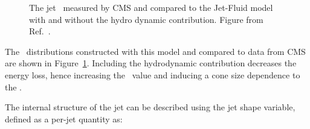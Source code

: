 \begin{figure}
\begin{center}
\begin{minipage}[b]{0.43\textwidth}
\caption{The jet \RAA\ measured by CMS \cite{Khachatryan:2016jfl} and compared to the Jet-Fluid model with and without the hydro dynamic contribution.
Figure from Ref.~\cite{Tachibana:2017syd}.}
\label{fig:jf_raa}
  \end{minipage}
  \end{center}
\end{figure}




The \RAA\ distributions constructed with this model and compared to data from CMS \cite{Khachatryan:2016jfl} are shown in Figure~\ref{fig:jf_raa}.
Including the hydrodynamic contribution decreases the energy loss, hence increasing the \RAA\ value and inducing a cone size dependence to the \RAA.


The internal structure of the jet can be described using the jet shape variable, defined as a per-jet quantity as:

